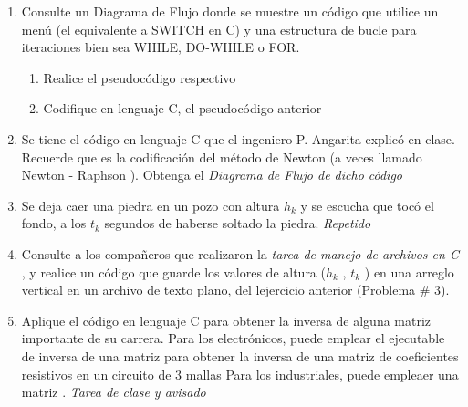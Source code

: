 \documentclass[letter,12pt,twoside]{book} 	%
\begin{document}
\noindent
\begin{enumerate}
\item Consulte un Diagrama de Flujo donde se muestre un código que utilice un menú (el equivalente a SWITCH  en C) y una estructura de bucle para iteraciones bien sea WHILE, DO-WHILE o FOR. 

\begin{multicols}{2}
\begin{enumerate}
\item   Realice el pseudocódigo respectivo
\item  Codifique en lenguaje C, el pseudocódigo anterior 
\end{enumerate}    
\end{multicols}

\item Se tiene el  código en lenguaje C que el ingeniero P. Angarita explicó en clase. Recuerde que es la codificación del método de Newton (a veces llamado Newton - Raphson ). Obtenga el {\it Diagrama de Flujo de dicho código}
\item Se deja caer una piedra en un pozo con altura  $ h_{k}$ y se escucha que tocó el fondo, a los $t_k$ segundos de haberse soltado la piedra.  {\it Repetido}

\begin{enumerate}

\end{enumerate}

\item Consulte a los compañeros que realizaron la {\it tarea de manejo de archivos en C }, y realice un código que guarde los valores de altura ($h_{k}$ , $t_{k}$ ) en una arreglo vertical en un archivo de texto plano, del lejercicio anterior (Problema \# 3).

\item Aplique el código en lenguaje C para obtener la inversa de  alguna matriz importante de su carrera. Para los electrónicos, puede emplear el ejecutable de inversa de una matriz para obtener la inversa de una matriz de coeficientes resistivos en un circuito de 3 mallas Para los industriales, puede empleaer una matriz . {\it Tarea de clase y avisado}
\end{enumerate}    
\end{document}
